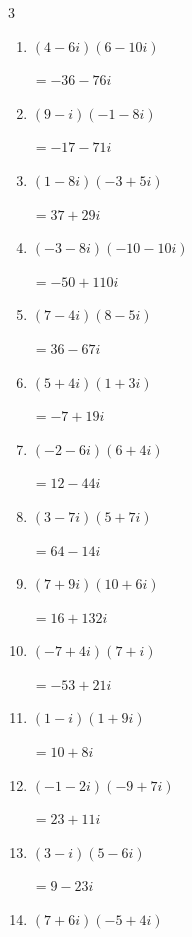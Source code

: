 \begin{multicols}{3}
\begin{enumerate}
  \item $\displaystyle (4-6i)(6-10i)$

        $\displaystyle =-36-76i$

  \item $\displaystyle (9-i)(-1-8i)$

        $\displaystyle =-17-71i$

  \item $\displaystyle (1-8i)(-3+5i)$

        $\displaystyle =37+29i$

  \item $\displaystyle (-3-8i)(-10-10i)$

        $\displaystyle =-50+110i$

  \item $\displaystyle (7-4i)(8-5i)$

        $\displaystyle =36-67i$

  \item $\displaystyle (5+4i)(1+3i)$

        $\displaystyle =-7+19i$

  \item $\displaystyle (-2-6i)(6+4i)$

        $\displaystyle =12-44i$

  \item $\displaystyle (3-7i)(5+7i)$

        $\displaystyle =64-14i$

  \item $\displaystyle (7+9i)(10+6i)$

        $\displaystyle =16+132i$

\columnbreak %

  \item $\displaystyle (-7+4i)(7+i)$

        $\displaystyle =-53+21i$

  \item $\displaystyle (1-i)(1+9i)$

        $\displaystyle =10+8i$

  \item $\displaystyle (-1-2i)(-9+7i)$

        $\displaystyle =23+11i$

  \item $\displaystyle (3-i)(5-6i)$

        $\displaystyle =9-23i$

  \item $\displaystyle (7+6i)(-5+4i)$


\end{enumerate}
\end{multicols}
